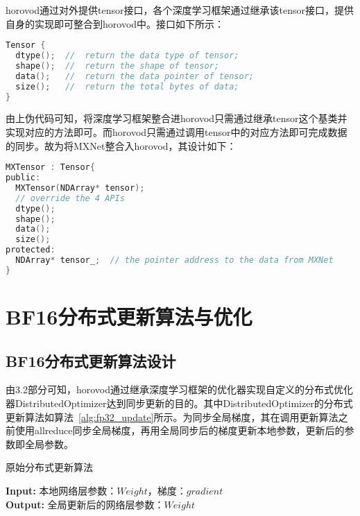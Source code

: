 horovod通过对外提供tensor接口，各个深度学习框架通过继承该tensor接口，提供自身的实现即可整合到horovod中。接口如下所示：

\begin{lstlisting}[language=C, numbers=none]
Tensor {
  dtype();  //  return the data type of tensor;
  shape();  //  return the shape of tensor;
  data();   //  return the data pointer of tensor;
  size();   //  return the total bytes of data;
}
\end{lstlisting}

由上伪代码可知，将深度学习框架整合进horovod只需通过继承tensor这个基类并实现对应的方法即可。而horovod只需通过调用tensor中的对应方法即可完成数据的同步。故为将MXNet整合入horovod，其设计如下：

\begin{lstlisting}[language=C, numbers=none]
MXTensor : Tensor{
public:
  MXTensor(NDArray* tensor);
  // override the 4 APIs
  dtype();
  shape();
  data();
  size();
protected:
  NDArray* tensor_;  // the pointer address to the data from MXNet
}
\end{lstlisting}

\section{BF16分布式更新算法与优化}
\subsection{BF16分布式更新算法设计}
由3.2部分可知，horovod通过继承深度学习框架的优化器实现自定义的分布式优化器DistributedOptimizer达到同步更新的目的。其中DistributedOptimizer的分布式更新算法如算法~\ref{alg:fp32_update}所示。为同步全局梯度，其在调用更新算法之前使用allreduce同步全局梯度，再用全局同步后的梯度更新本地参数，更新后的参数即全局参数。

\begin{algorithm}\small
\caption{原始分布式更新算法}
\textbf{Input:}
本地网络层参数：$Weight$，梯度：$gradient$ \\
\textbf{Output:} 
全局更新后的网络层参数：$Weight$
\begin{algorithmic}[1]
\end{algorithmic}
	\label{alg:fp32_update}
\end{algorithm}

